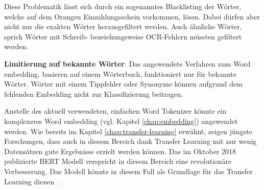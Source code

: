 Diese Problematik lässt sich durch ein sogenanntes Blacklisting der Wörter, welche auf dem Orangen Einzahlungsschein vorkommen, lösen. Dabei dürfen aber nicht nur die exakten Wörter herausgefiltert werden. Auch ähnliche Wörter, sprich Wörter mit Schreib- bezeiehungsweise OCR-Fehlern müssten gefiltert werden.


\textbf{Limitierung auf bekannte Wörter}: Das angewendete Verfahren zum Word embedding, basieren auf einem Wörterbuch, funktioniert nur für bekannte Wörter. Wörter mit einem Tippfehler oder Synonyme können aufgrund dem fehlenden Embedding nicht zur Klassifizierung beitragen.

Anstelle des aktuell verwendeten, einfachen Word Tokenizer könnte ein komplexeres Word embedding (vgl. Kapitel \ref{chap:embedding}) angewendet werden. Wie bereits im Kapitel \ref{chap:transfer-learning} erwähnt, zeigen jüngste Forschungen, dass auch in diesem Bereich dank Transfer Learning mit nur wenig Datensätzen gute Ergebnisse erzielt werden können. Das im Oktober 2018 publizierte BERT Modell verspricht in diesem Bereich eine revolutionäre Verbesserung. Das Modell könnte in diesem Fall als Grundlage für das Transfer Learning dienen~\autocite{Devlin2018}.
